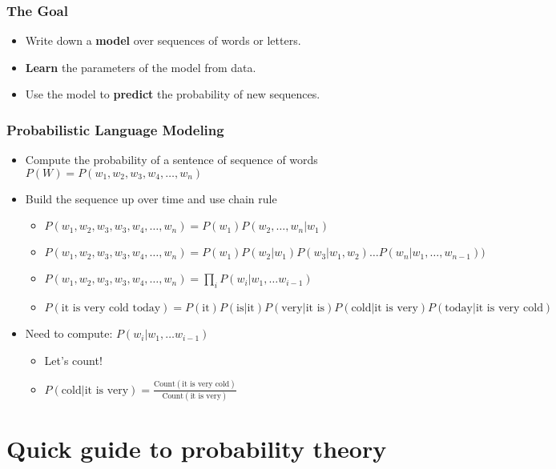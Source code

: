 \begin{frame}
\frametitle{The Goal}
\begin{itemize}[<+->]
\item Write down a \textbf{model} over sequences of words or letters.
\item \textbf{Learn} the parameters of the model from data.
\item Use the model to \textbf{predict} the probability of new sequences.
\end{itemize}
\end{frame}

\begin{frame}
\frametitle{Probabilistic Language Modeling}
\begin{itemize}[<+->]
\item Compute the probability of a sentence of sequence of words
      $P(W) = P(w_1, w_2, w_3, w_4, \ldots, w_n)$
\item Build the sequence up over time and use chain rule
  \begin{itemize}[<+->]
  \item $P(w_1, w_2, w_3, w_3, w_4, \ldots, w_n) = P(w_1) P(w_2, \ldots, w_n | w_1)$ 
  \item $P(w_1, w_2, w_3, w_3, w_4, \ldots, w_n) = P(w_1) P(w_2 | w_1) P(w_3 | w_1, w_2) \ldots P(w_n | w_1, \ldots, w_{n-1}))$ 
  \item $P(w_1, w_2, w_3, w_3, w_4, \ldots, w_n) = \prod_i P(w_i | w_1, \ldots w_{i-1})$
  \item $P(\text{it is very cold today}) = P(\text{it}) P(\text{is}|\text{it}) P(\text{very}|\text{it is}) P(\text{cold}|\text{it is very}) P(\text{today}|\text{it is very cold})$
  \end{itemize}
\item Need to compute: $P(w_i | w_1, \ldots w_{i-1})$
  \begin{itemize}[<+->]
    \item Let's count!
    \item $P(\text{cold}|\text{it is very}) = \frac{\text{Count}(\text{it is very cold})}{\text{Count}(\text{it is very})}$ 
  \end{itemize}
\end{itemize}
\end{frame}



\section{Quick guide to probability theory}
\frame{\tableofcontents[currentsection]}

